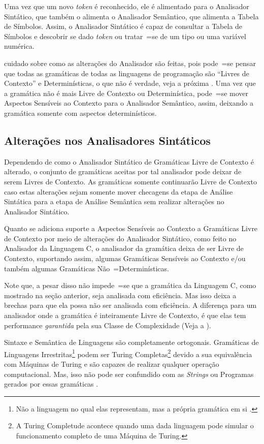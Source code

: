 Uma vez que um novo \textit{token} é reconhecido,
ele é alimentado para o Analisador Sintático,
que também o alimenta o Analisador Semântico,
que alimenta a Tabela de Símbolos.
Assim,
o Analisador Sintático é capaz de consultar a Tabela de Símbolos \cite{ahoCompilerDragonBook} e
descobrir se dado \textit{token} ou
tratar~=se de um tipo ou
uma variável numérica.

 cuidado sobre como as alterações do Analisador são feitas,
pois pode~=se pensar que todas as gramáticas de todas as linguagens de programação são ``Livres de Contexto'' e
Determinísticas,
o que não é verdade,
veja a próxima .
Uma vez que a gramática não é mais Livre de Contexto ou
Determinística,
pode~=se mover Aspectos Sensíveis ao Contexto para o Analisador Semântico,
assim,
deixando a gramática somente com aspectos determinísticos.


\subsection{Alterações nos Analisadores Sintáticos}
\label{alteracoesNosAnalisadoresSintaticos}

Dependendo de como o Analisador Sintático de Gramáticas Livre de Contexto é alterado,
o conjunto de gramáticas aceitas por tal analisador pode deixar de serem Livres de Contexto.
As gramáticas somente continuarão Livre de Contexto caso estas alterações sejam somente mover checagens da etapa de Análise Sintática para a etapa de Análise Semântica sem realizar alterações no Analisador Sintático.

Quanto se adiciona suporte a Aspectos Sensíveis ao Contexto \cite{contextSensitiveParsing} a Gramáticas Livre de Contexto por meio de alterações do Analisador Sintático,
como feito no Analisador da Linguagem C,
o analisador da gramática deixa de ser Livre de Contexto,
suportando assim,
algumas Gramáticas Sensíveis ao Contexto e\slash{}ou também algumas Gramáticas Não~=Determinísticas.

Note que,
a pesar disso não impede~=se que a gramática da Linguagem C,
como mostrado na seção anterior,
seja analisada com eficiência.
Mas isso deixa a brechas para que ela possa não ser analisada com eficiência.
A diferença para um analisador onde a gramática é inteiramente Livre de Contexto,
é que elas tem performance \textit{garantida} pela sua Classe de Complexidade (Veja a ).

Sintaxe e
Semântica de Linguagens são completamente ortogonais.
Gramáticas de Linguagens Irrestritas\footnote{
Não a linguagem no qual elas representam,
mas a própria gramática em si \cite{finiteAutomataTuringComplete}.
}
podem ser Turing Completas\footnote{
A Turing Completude acontece quando uma dada linguagem pode simular o funcionamento completo de uma Máquina de Turing.
}
devido a sua equivalência com Máquinas de Turing e
são capazes de realizar qualquer operação computacional.
Mas,
isso não pode ser confundido com as \textit{Strings} ou
Programas gerados por essas gramáticas \cite{areThereDomainSpecificLanguages}.

